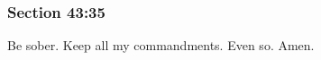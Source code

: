 	\subsubsection{Section 43:35} %
		\label{DC43-35}

		Be sober.  Keep all my commandments.  Even so.  Amen.

